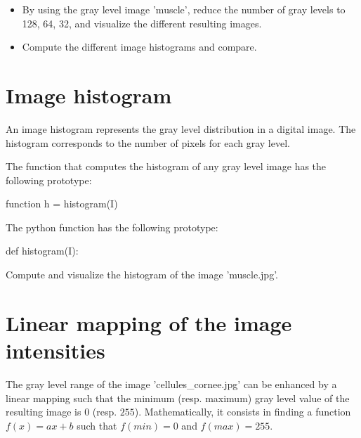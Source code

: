 \begin{qbox}
\begin{itemize}
\item By using the gray level image 'muscle', reduce the number of gray levels to  128, 64, 32, and visualize the different resulting images.
\item Compute the different image histograms and compare. 
\end{itemize}
\end{qbox}



\vspace*{-8pt}
\section{Image histogram}
An image histogram represents the gray level distribution in a digital image.
The histogram corresponds to the number of pixels for each gray level.
\begin{mcomment}
The \matlabregistered{} function that computes the histogram of any gray level image has the following prototype:
\begin{matlab}
function h = histogram(I)
\end{matlab}
\end{mcomment}

\begin{pcomment}
The python function has the following prototype:
\begin{python}
def histogram(I):
\end{python}
\end{pcomment}

\begin{qbox}
Compute and visualize the histogram of the image 'muscle.jpg'.
\end{qbox}



\vspace*{-8pt}
\section{Linear mapping of the image in\-ten\-si\-ties}

The gray level range of the image 'cellules\_cornee.jpg' can be enhanced by a linear map\-ping such that the minimum (resp. maximum) gray level value of the resulting image is $0$ (resp. $255$). Mathematical\-ly, it consists in finding a function $f(x)=ax+b$ such that 
$f(min)=0$ and $f(max)=255$.

